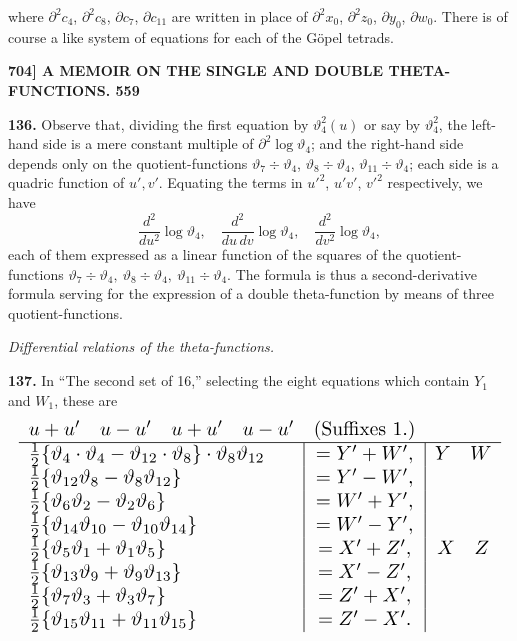 \documentclass[11pt]{article}
\begin{document}
where $\partial^2 c_4$, $\partial^2 c_8$, $\partial c_7$, $\partial c_{11}$ are written in place of $\partial^2 x_0$, $\partial^2 z_0$, $\partial y_0$, $\partial w_0$. There is of course a like system of equations for each of the G\"opel tetrads.

\newpage
\noindent\textbf{704] \quad A MEMOIR ON THE SINGLE AND DOUBLE THETA-FUNCTIONS. \hfill 559}

\medskip
\textbf{136.} Observe that, dividing the first equation by $\vartheta_4^2(u)$ or say by $\vartheta_4^2$, the left-hand side is a mere constant multiple of $\partial^2\log\vartheta_4$; and the right-hand side depends only on the quotient-functions $\vartheta_7 \div \vartheta_4$, $\vartheta_8 \div \vartheta_4$, $\vartheta_{11} \div \vartheta_4$; each side is a quadric function of $u', v'$. Equating the terms in $u'^2$, $u'v'$, $v'^2$ respectively, we have
\[
\frac{d^2}{du^2}\log\vartheta_4,\quad \frac{d^2}{du\,dv}\log\vartheta_4,\quad \frac{d^2}{dv^2}\log\vartheta_4,
\]
each of them expressed as a linear function of the squares of the quotient-functions $\vartheta_7\div\vartheta_4,\ \vartheta_8\div\vartheta_4,\ \vartheta_{11}\div\vartheta_4$. The formula is thus a second-derivative formula serving for the expression of a double theta-function by means of three quotient-functions.

\medskip
\begin{center}\textit{Differential relations of the theta-functions.}\end{center}

\medskip
\textbf{137.} In ``The second set of 16,'' selecting the eight equations which contain $Y_1$ and $W_1$, these are
\[
\resizebox{\textwidth}{!}{$\displaystyle
\begin{array}{l|c|c}
\multicolumn{1}{c}{u+u'\quad u-u'\quad u+u'\quad u-u'} & \multicolumn{1}{c}{(\text{Suffixes 1.})} & \\\hline
\tfrac{1}{2}\{\vartheta_4\cdot\vartheta_4 - \vartheta_{12}\cdot\vartheta_8\}\cdot\vartheta_8\vartheta_{12} & = Y' + W', & Y\quad W\\
\tfrac{1}{2}\{\vartheta_{12}\vartheta_8 - \vartheta_8\vartheta_{12}\} & = Y' - W', & \\
\tfrac{1}{2}\{\vartheta_6\vartheta_2 - \vartheta_2\vartheta_6\} & = W' + Y', & \\
\tfrac{1}{2}\{\vartheta_{14}\vartheta_{10} - \vartheta_{10}\vartheta_{14}\} & = W' - Y', & \\
\tfrac{1}{2}\{\vartheta_5\vartheta_1 + \vartheta_1\vartheta_5\} & = X' + Z', & X\quad Z\\
\tfrac{1}{2}\{\vartheta_{13}\vartheta_9 + \vartheta_9\vartheta_{13}\} & = X' - Z', & \\
\tfrac{1}{2}\{\vartheta_7\vartheta_3 + \vartheta_3\vartheta_7\} & = Z' + X', & \\
\tfrac{1}{2}\{\vartheta_{15}\vartheta_{11} + \vartheta_{11}\vartheta_{15}\} & = Z' - X'. & \\
\end{array}
$}
\]
\end{document}
